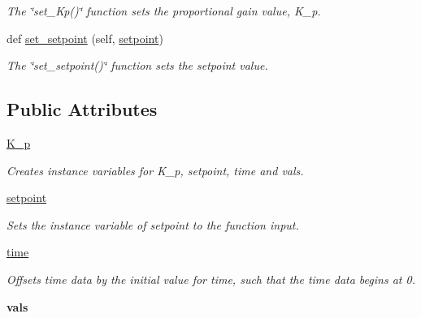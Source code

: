 \begin{DoxyCompactItemize}
\begin{DoxyCompactList}\small\item\em The \char`\"{}set\+\_\+\+Kp()\char`\"{} function sets the proportional gain value, K\+\_\+p. \end{DoxyCompactList}\item 
def \mbox{\hyperlink{classcontroller_1_1_controller_a8a682a3fddd60e136faf9f138639f1d9}{set\+\_\+setpoint}} (self, \mbox{\hyperlink{classcontroller_1_1_controller_ace8a70b35ea15f3f7b6548c64aee1e48}{setpoint}})
\begin{DoxyCompactList}\small\item\em The \char`\"{}set\+\_\+setpoint()\char`\"{} function sets the setpoint value. \end{DoxyCompactList}\end{DoxyCompactItemize}
\subsection*{Public Attributes}
\begin{DoxyCompactItemize}
\item 
\mbox{\hyperlink{classcontroller_1_1_controller_a6147d7f8aa12e56ef01036ddd2b55ee9}{K\+\_\+p}}
\begin{DoxyCompactList}\small\item\em Creates instance variables for K\+\_\+p, setpoint, time and vals. \end{DoxyCompactList}\item 
\mbox{\hyperlink{classcontroller_1_1_controller_ace8a70b35ea15f3f7b6548c64aee1e48}{setpoint}}
\begin{DoxyCompactList}\small\item\em Sets the instance variable of setpoint to the function input. \end{DoxyCompactList}\item 
\mbox{\hyperlink{classcontroller_1_1_controller_a2cfb3777cd10bf5fa09cc73af41bb133}{time}}
\begin{DoxyCompactList}\small\item\em Offsets time data by the initial value for time, such that the time data begins at 0. \end{DoxyCompactList}\item 
\mbox{\label{classcontroller_1_1_controller_a08d7efc28b5c12d662b2a53b3627b8e6}} 
{\bfseries vals}
\end{DoxyCompactItemize}



